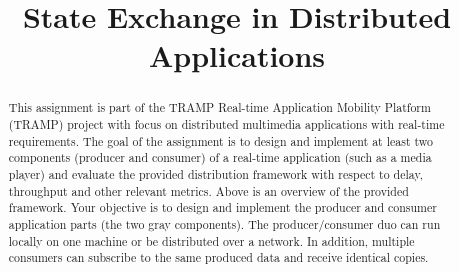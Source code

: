 \documentclass{acm_proc_article-sp}
\begin{document}
\title{State Exchange in Distributed Applications}

%
%
%
%
%

%
\author{}


\maketitle
\begin{abstract}
This assignment is part of the TRAMP Real-time Application Mobility Platform (TRAMP) project with focus on distributed multimedia applications with real-time requirements.
The goal of the assignment is to design and implement at least two components (producer and consumer) of a real-time application (such as a media player) and evaluate the provided distribution framework with respect to delay, throughput and other relevant metrics. Above is an overview of the provided framework. Your objective is to design and implement the producer and consumer application parts (the two gray components). The producer/consumer duo can run locally on one machine or be distributed over a network. In addition, multiple consumers can subscribe to the same produced data and receive identical copies.
\end{abstract}
\end{document}
